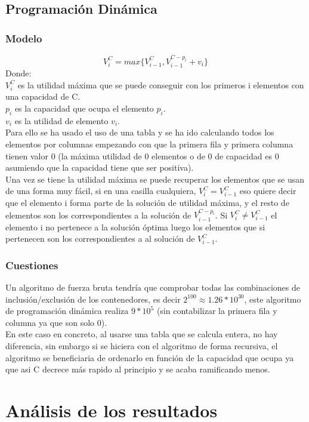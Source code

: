 \documentclass[11pt,spanish]{article}
\begin{document}
		\subsection{Programación Dinámica}
			\subsubsection{Modelo}
			$$V_i^C = max\{V_{i-1}^C,V_{i-1}^{C-p_i}+v_i\} $$
			Donde:\\
			$V_i^C$ es la utilidad máxima que se puede conseguir con los primeros i elementos con una capacidad de C.\\
			$p_i$ es la capacidad que ocupa el elemento $p_i$.\\
			$v_i$ es la utilidad de elemento $v_i$.\\
			Para ello se ha usado el uso de una tabla y se ha ido calculando todos los elementos por columnas empezando con que la primera fila y primera columna tienen valor 0 (la máxima utilidad de 0 elementos o de 0 de capacidad es 0 asumiendo que la capacidad tiene que ser positiva).\\
			Una vez se tiene la utilidad máxima se puede recuperar los elementos que se usan de una forma muy fácil, si en una casilla cualquiera, $V_i^C=V_{i-1}^C$ eso quiere decir que el elemento i forma parte de la solución de utilidad máxima, y el resto de elementos son los correspondientes a la solución de $V_{i-1}^{C-p_i}$. Si $V_i^C \neq V_{i-1}^C$ el elemento i no pertenece a la solución óptima luego los elementos que si pertenecen son los correspondientes a al solución de $V_{i-1}^C$.
			\subsubsection{Cuestiones}
			Un algoritmo de fuerza bruta tendría que comprobar todas las combinaciones de inclusión/exclusión de los contenedores, es decir $2^{100} \approx 1.26*10^{30}$, este algoritmo de programación dinámica realiza $9*10^5$ (sin contabilizar la primera fila y columna ya que son solo 0).\\
			En este caso en concreto, al usarse una tabla que se calcula entera, no hay diferencia, sin embargo si se hiciera con el algoritmo de forma recursiva, el algoritmo se beneficiaria de ordenarlo en función de la capacidad que ocupa ya que asi C decrece más rapido al principio y se acaba ramificando menos.
	\section{Análisis de los resultados}
\end{document}
